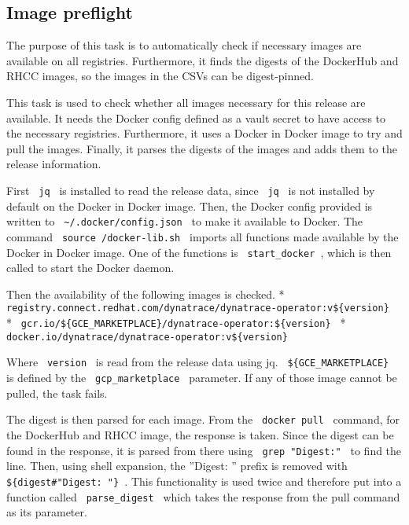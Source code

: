 \subsection{Image preflight}\label{subsec:image-preflight}

The purpose of this task is to automatically check if necessary images are available on all registries.
Furthermore, it finds the digests of the DockerHub and RHCC images, so the images in the CSVs can be digest-pinned.

This task is used to check whether all images necessary for this release are available.
It needs the Docker config defined as a vault secret to have access to the necessary registries.
Furthermore, it uses a Docker in Docker image to try and pull the images.
Finally, it parses the digests of the images and adds them to the release information.

First \verb| jq | is installed to read the release data, since \verb| jq | is not installed by default on the Docker in Docker image.
Then, the Docker config provided is written to \verb| ~/.docker/config.json | to make it available to Docker.
The command \verb| source /docker-lib.sh | imports all functions made available by the Docker in Docker image.
One of the functions is \verb| start_docker |, which is then called to start the Docker daemon.

Then the availability of the following images is checked.
* \verb| registry.connect.redhat.com/dynatrace/dynatrace-operator:v${version} |
* \verb| gcr.io/${GCE_MARKETPLACE}/dynatrace-operator:${version} |
* \verb| docker.io/dynatrace/dynatrace-operator:v${version} |

Where \verb| version | is read from the release data using jq.
\verb| ${GCE_MARKETPLACE} | is defined by the \verb| gcp_marketplace | parameter.
If any of those image cannot be pulled, the task fails.

The digest is then parsed for each image.
From the \verb| docker pull | command, for the DockerHub and RHCC image, the response is taken.
Since the digest can be found in the response, it is parsed from there using \verb| grep "Digest:" | to find the line.
Then, using shell expansion, the ''Digest: '' prefix is removed with \verb| ${digest#"Digest: "} |.
This functionality is used twice and therefore put into a function called \verb| parse_digest | which takes the response from the pull command as its parameter.
